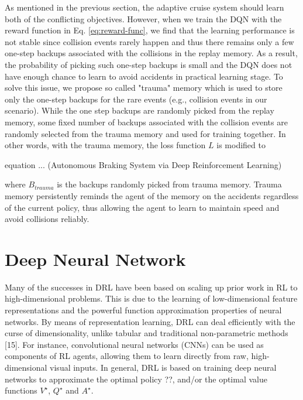 As mentioned in the previous section, the adaptive cruise system should learn both of the conflicting objectives. However, when we train the DQN with the reward function in Eq. \ref{eq:reward-func}, we find that the learning performance is not stable since collision events rarely happen and thus there remains only a few one-step backups associated with the collisions in the replay memory. As a result, the probability of picking such one-step backups is small and the DQN does not have enough chance to learn to avoid accidents in practical learning stage. To solve this issue, we propose so called "trauma" memory which is used to store only the one-step backups for the rare events (e.g., collision events in our scenario). While the one step backups are randomly picked from the replay memory, some fixed number of backups associated with the collision events are randomly selected from the trauma memory and used for training together. In other words, with the trauma memory, the loss function $L$ is modified to

equation ... (Autonomous Braking System via Deep Reinforcement Learning)

where $B_{trauma}$ is the backups randomly picked from trauma memory. Trauma memory persistently reminds the agent of the memory on the accidents regardless of the current policy, thus allowing the agent to learn to maintain speed and avoid collisions reliably.


\section{Deep Neural Network}

Many of the successes in DRL have been based on scaling up prior work in RL to high-dimensional problems. This is due to the learning of low-dimensional feature representations and the powerful function approximation properties of neural networks. By means of representation learning, DRL can deal efficiently with the curse of dimensionality, unlike tabular and traditional non-parametric methods [15]. For instance, convolutional neural networks (CNNs) can be used as components of RL agents, allowing them to learn directly from raw, high-dimensional visual inputs. In general, DRL is based on training deep neural networks to approximate the optimal policy ??, and/or the optimal value functions $V^\star$, $Q^\star$ and $A^\star$.

